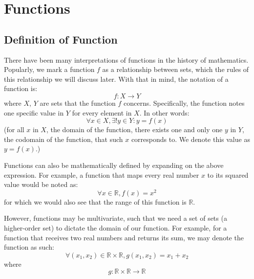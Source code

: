 \chapter{Functions}

\section{Definition of Function}
There have been many interpretations of functions in the history of mathematics.
Popularly, we mark a function $f$ as a relationship between sets, which the rules of this relationship we will discuss later.
With that in mind, the notation of a function is:
\[
    f : X \rightarrow Y
\]
where $X$, $Y$ are sets that the function $f$ concerns. Specifically, the function notes one specific value in $Y$ for every element in $X$. In other words:
\[
    \forall x \in X, \exists! y \in Y: y = f(x)
\]
(for all $x$ in $X$, the domain of the function, there exists one and only one $y$ in $Y$, the codomain of the function, that such $x$ corresponds to. We denote this value as $y = f(x)$.)

Functions can also be mathematically defined by expanding on the above expression. For example, a function that maps every real number $x$ to its squared value would be noted as:
\[
    \forall x \in \mathbb{R}, f(x) = x^2
\]
for which we would also see that the range of this function is $\mathbb{R}$.

However, functions may be multivariate, such that we need a set of sets (a higher-order set) to dictate the domain of our function.
For example, for a function that receives two real numbers and returns its sum, we may denote the function as such:
\[
    \forall (x_1, x_2) \in \mathbb{R} \times \mathbb{R}, g(x_1, x_2) = x_1 + x_2
\]
where
\[
    g: \mathbb{R} \times \mathbb{R} \rightarrow \mathbb{R}
\]

